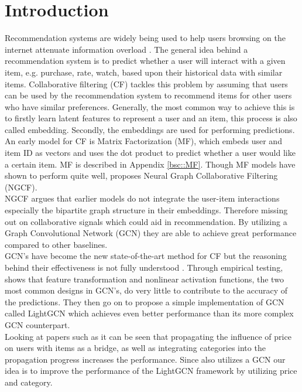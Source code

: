 \section{Introduction}
Recommendation systems are widely being used to help users browsing on the internet attenuate information overload \cite{YT_rec,Pint_rec}.
The general idea behind a recommendation system is to predict whether a user will interact with a given item, e.g. purchase, rate, watch, based upon their historical data with similar items.
Collaborative filtering (CF) tackles this problem by assuming that users can be used by the recommendation system to recommend items for other users who have similar preferences.
Generally, the most common way to achieve this is to firstly learn latent features to represent a user and an item, this process is also called embedding.
Secondly, the embeddings are used for performing predictions.
\\
An early model for CF is Matrix Factorization (MF), which embeds user and item ID as vectors and uses the dot product to predict whether a user would like a certain item.
MF is described in Appendix \autoref{bsc::MF}.
Though MF models have shown to perform quite well, \cite{NGCF_2019} proposes Neural Graph Collaborative Filtering (NGCF).
\\
NGCF argues that earlier models do not integrate the user-item interactions especially the bipartite graph structure in their embeddings.
Therefore missing out on collaborative signals which could aid in recommendation.
By utilizing a Graph Convolutional Network (GCN) they are able to achieve great performance compared to other baselines.
\\
GCN's have become the new state-of-the-art method for CF but the reasoning behind their effectiveness is not fully understood \cite{lightgcn}.
Through empirical testing, \cite{lightgcn} shows that feature transformation and nonlinear activation functions, the two most common designs in GCN's, do very little to contribute to the accuracy of the predictions.
They then go on to propose a simple implementation of GCN called LightGCN which achieves even better performance than its more complex GCN counterpart.
\\
Looking at papers such as \cite{Priceaware} it can be seen that propagating the influence of price on users with items as a bridge, as well as integrating categories into the propagation progress increases the performance.
Since \cite{Priceaware} also utilizes a GCN our idea is to improve the performance of the LightGCN framework by utilizing price and category.

